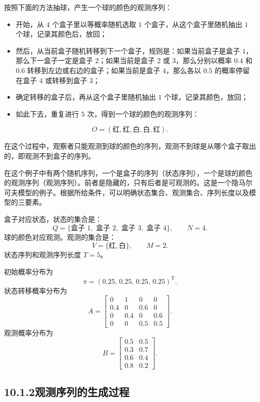 \documentclass[UTF8, 12pt, fontset=fandol, oneside]{ctexart}
\begin{document}
按照下面的方法抽球，产生一个球的颜色的观测序列：

\begin{itemize}
  \item 开始，从 $4$ 个盒子里以等概率随机选取 $1$ 个盒子，从这个盒子里随机抽出 $1$ 个球，记录其颜色后，放回；
  \item 然后，从当前盒子随机转移到下一个盒子，规则是：如果当前盒子是盒子 $1$，那么下一盒子一定是盒子 $2$；如果当前是盒子 $2$ 或 $3$，那么分别以概率 $0.4$ 和 $0.6$ 转移到左边或右边的盒子；如果当前是盒子 $4$，那么各以 $0.5$ 的概率停留在盒子 $4$ 或转移到盒子 $3$；
  \item 确定转移的盒子后，再从这个盒子里随机抽出 $1$ 个球，记录其颜色，放回；
  \item 如此下去，重复进行 $5$ 次，得到一个球的颜色的观测序列：
\end{itemize}
\[
  O=(\text{红},\text{红},\text{白},\text{白},\text{红}).
\]

在这个过程中，观察者只能观测到球的颜色的序列，观测不到球是从哪个盒子取出的，即观测不到盒子的序列。

在这个例子中有两个随机序列，一个是盒子的序列（状态序列），一个是球的颜色的观测序列（观测序列）。前者是隐藏的，只有后者是可观测的。这是一个隐马尔可夫模型的例子。根据所给条件，可以明确状态集合、观测集合、序列长度以及模型的三要素。

盒子对应状态，状态的集合是：
\[
  Q=\{\text{盒子 }1,\text{ 盒子 }2,\text{ 盒子 }3,\text{ 盒子 }4\},\qquad N=4.
\]
球的颜色对应观测。观测的集合是：
\[
  V=\{\text{红},\text{白}\},\qquad M=2.
\]
状态序列和观测序列长度 $T=5$。

初始概率分布为
\[
  \pi=(0.25,\,0.25,\,0.25,\,0.25)^{\mathrm T}.
\]
状态转移概率分布为
\[
  A=
  \begin{bmatrix}
    0 & 1 & 0 & 0\\
    0.4 & 0 & 0.6 & 0\\
    0 & 0.4 & 0 & 0.6\\
    0 & 0 & 0.5 & 0.5
  \end{bmatrix}.
\]
观测概率分布为
\[
  B=
  \begin{bmatrix}
    0.5 & 0.5\\
    0.3 & 0.7\\
    0.6 & 0.4\\
    0.8 & 0.2
  \end{bmatrix}.
\]

\subsection*{10.1.2\quad 观测序列的生成过程}
\end{document}
